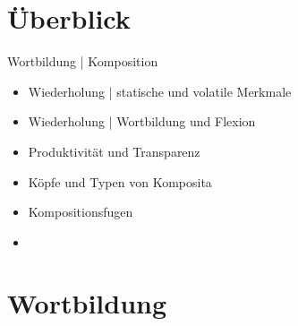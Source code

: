 \section{Überblick}

\begin{frame}
  {Wortbildung | Komposition}
  \onslide<+->
  \begin{itemize}[<+->]
    \item Wiederholung | statische und volatile Merkmale
    \item Wiederholung | Wortbildung und Flexion
      \Zeile
    \item Produktivität und Transparenz
    \item Köpfe und Typen von Komposita
    \item Kompositionsfugen
      \Zeile
    \item \citet{Schaefer2018b}
  \end{itemize}
\end{frame}

\section{Wortbildung}

